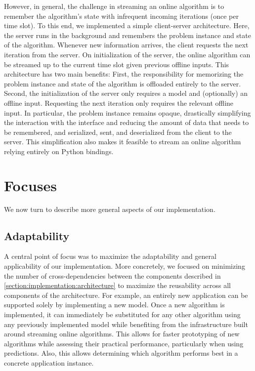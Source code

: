 However, in general, the challenge in streaming an online algorithm is to remember the algorithm's state with infrequent incoming iterations (once per time slot). To this end, we implemented a simple client-server architecture. Here, the server runs in the background and remembers the problem instance and state of the algorithm. Whenever new information arrives, the client requests the next iteration from the server. On initialization of the server, the online algorithm can be streamed up to the current time slot given previous offline inputs. This architecture has two main benefits: First, the responsibility for memorizing the problem instance and state of the algorithm is offloaded entirely to the server. Second, the initialization of the server only requires a model and (optionally) an offline input. Requesting the next iteration only requires the relevant offline input. In particular, the problem instance remains opaque, drastically simplifying the interaction with the interface and reducing the amount of data that needs to be remembered, and serialized, sent, and deserialized from the client to the server. This simplification also makes it feasible to stream an online algorithm relying entirely on Python bindings.

\section{Focuses}

We now turn to describe more general aspects of our implementation.

\subsection{Adaptability}

A central point of focus was to maximize the adaptability and general applicability of our implementation. More concretely, we focused on minimizing the number of cross-dependencies between the components described in \autoref{section:implementation:architecture} to maximize the reusability across all components of the architecture. For example, an entirely new application can be supported solely by implementing a new model. Once a new algorithm is implemented, it can immediately be substituted for any other algorithm using any previously implemented model while benefiting from the infrastructure built around streaming online algorithms. This allows for faster prototyping of new algorithms while assessing their practical performance, particularly when using predictions. Also, this allows determining which algorithm performs best in a concrete application instance.

